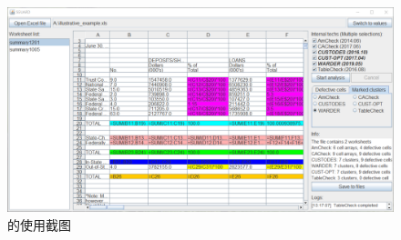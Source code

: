 \begin{figure}[tbp]    
    \centering
    \includegraphics[width=\textwidth]{figure/figure11.png}
    \caption{\sg 的使用截图}
    \label{figure11}
\end{figure}